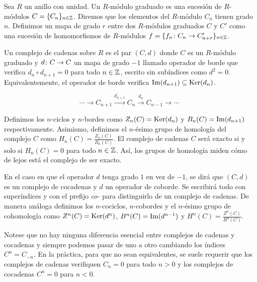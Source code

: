 

Sea $R$ un anillo con unidad. Un $R$-módulo graduado es una sucesión de $R$-módulos $C=\{C_n\}_{n\in\mathbb{Z}}$. Diremos que los elementos del $R$-módulo $C_n$ tienen grado $n$.
Definimos un mapa de grado $r$ entre dos $R$-módulos graduados $C$ y $C'$ como una sucesión de homomorfismos de $R$-módulos $f=\{f_n\colon C_n\to C_{n+r}'\}_{n\in\mathbb{Z}}$.

Un complejo de cadenas sobre $R$ es el par $(C,d)$ donde $C$ es un $R$-módulo graduado y $d\colon C\to C$ un mapa de grado $-1$ llamado operador de borde que verifica $d_{n}\circ d_{n+1}=0$ para todo $n\in\mathbb{Z}$, escrito sin subíndices como $d^2 = 0$. Equivalentemente, el operador de borde verifica $\operatorname{Im}(d_{n+1})\subseteq \operatorname{Ker}(d_{n})$.

\begin{equation}
	\cdots  \xrightarrow{} C_{n+1} \xrightarrow{d_{n+1}} C_n \xrightarrow{d_n} C_{n-1} \xrightarrow{} \cdots 
\end{equation}

Definimos los $n$-ciclos y $n$-bordes como $Z_n(C)=\operatorname{Ker}(d_{n})$ y $B_n(C)=\operatorname{Im}(d_{n+1})$ respectivamente. Asimismo, definimos el $n$-ésimo grupo de homología del complejo $C$ como $H_n(C) = \frac{Z_n(C)}{B_n(C)}$. El complejo de cadenas $C$ será exacto si y solo si $H_n(C) = 0$ para todo $n\in\mathbb{Z}$. Así, los grupos de homología miden cómo de lejos está el complejo de ser exacto.

En el caso en que el operador $d$ tenga grado $1$ en vez de $-1$, se dirá que $(C,d)$ es un complejo de cocadenas y $d$ un operador de coborde. Se escribirá todo con superíndices y con el prefijo \textit{co-} para distinguirlo de un complejo de cadenas. De manera análoga definimos los $n$-cociclos, $n$-cobordes y el $n$-ésimo grupo de cohomología como $Z^n(C)=\operatorname{Ker}(d^n)$, $B^n(C)=\operatorname{Im}(d^{n-1})$ y $H^n(C)=\frac{Z^n(C)}{B^n(C)}$.

Notese que no hay ninguna diferencia esencial entre complejos de cadenas y cocadenas y siempre podemos pasar de uno a otro cambiando los índices $C^n = C_{-n}$. En la práctica, para que no sean equivalentes, se suele requerir que los complejos de cadenas verifiquen $C_n = 0$ para todo $n>0$ y los complejos de cocadenas $C^n=0$ para $n<0$.

